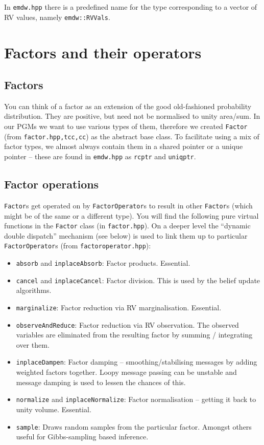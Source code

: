 \documentclass[english]{article}
\begin{document}
In \texttt{emdw.hpp} there is a predefined name for the type
corresponding to a vector of RV values, namely \texttt{emdw::RVVals}.

\section{Factors and their operators} \label{sec:factors_general}


\subsection{Factors}

You can think of a factor as an extension of the good old-fashioned
probability distribution. They are positive, but need not be normalised
to unity area/sum. In our PGMs we want to use various types of them,
therefore we created \texttt{Factor} (from \texttt{factor.{hpp,tcc,cc}}) as
the abstract base class. To facilitate using a mix of factor types,
we almost always contain them in a shared pointer or a unique pointer
-- these are found in \texttt{emdw.hpp} as \texttt{rcptr} and \texttt{uniqptr}.


\subsection{Factor operations}

\texttt{Factor}s get operated on by \texttt{FactorOperator}s to result in
other \texttt{Factor}s (which might be of the same or a different
type). You will find the following pure virtual functions in the
\texttt{Factor} class (in \texttt{factor.hpp}). On a deeper level the
``dynamic double dispatch'' mechanism (see below) is used to link them
up to particular \texttt{FactorOperator}s (from \texttt{factoroperator.hpp}):
\begin{itemize}
\item \texttt{absorb} and \texttt{inplaceAbsorb}: Factor products. Essential.
\item \texttt{cancel} and \texttt{inplaceCancel}: Factor division. This is
  used by the belief update algorithms.
\item \texttt{marginalize}: Factor reduction via RV marginalisation. Essential.
\item \texttt{observeAndReduce}: Factor reduction via RV  observation. The
  observed variables are eliminated from the resulting factor by summing /
  integrating over them.
\item \texttt{inplaceDampen}: Factor damping -- smoothing/stabilising
  messages by adding weighted factors together. Loopy message passing
  can be unstable and message damping is used to lessen the chances of
  this.
\item \texttt{normalize} and \texttt{inplaceNormalize}: Factor
  normalisation -- getting it back to unity volume. Essential.
\item \texttt{sample}: Draws random samples from the particular
  factor. Amongst others useful for Gibbs-sampling based inference.
\end{itemize}
\end{document}
